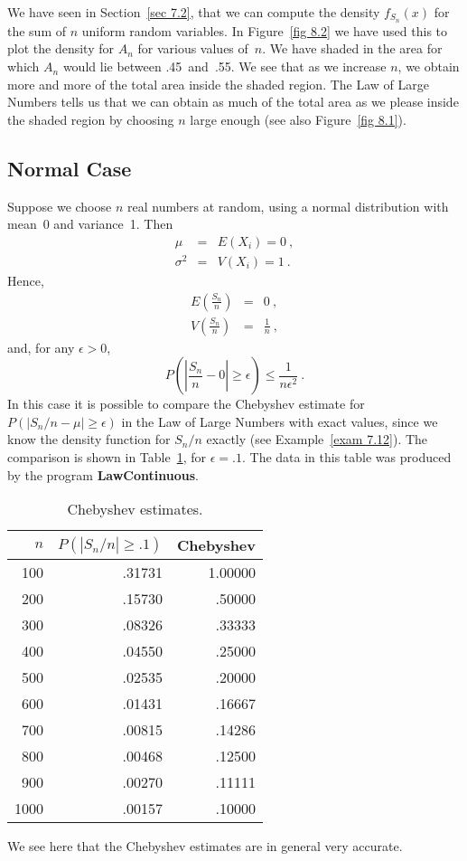{\begin{example}
We have seen in Section~\ref{sec 7.2}, that we can compute the density
$f_{S_n}(x)$ for the sum of $n$ uniform random variables.  In Figure~\ref{fig 8.2} we have
used this to plot the density for $A_n$ for various values of~$n$.  We have
shaded in the area for which $A_n$ would lie between .45~and~.55.  We see that as
we increase $n$, we obtain more and more of the total area inside the shaded
region.  The Law of Large Numbers tells us that we can obtain as much of the
total area as we please inside the shaded region by choosing $n$ large enough
(see also Figure~\ref{fig 8.1}).
\end{example}

\subsection*{Normal Case}
\begin{example}
Suppose we choose $n$ real numbers at random,
using a normal distribution with mean~0 and variance~1.  Then
\begin{eqnarray*}
         \mu &=& E(X_i) = 0\ , \\
    \sigma^2 &=& V(X_i) = 1\ .
\end{eqnarray*}
Hence,
\begin{eqnarray*}
E \left( \frac {S_n}n \right) &=& 0\ , \\
V \left( \frac {S_n}n \right) &=& \frac 1n\ ,
\end{eqnarray*}
and, for any $\epsilon > 0$,
$$
P\left( \left| \frac {S_n}n - 0 \right| \geq \epsilon \right) \leq \frac
1{n\epsilon^2}\ .
$$
In this case it is possible to compare the Chebyshev estimate for $P(|S_n/n -
\mu| \geq \epsilon)$ in the Law of Large Numbers with exact values, since we
know the density function for $S_n/n$ exactly (see Example~\ref{exam 7.12}). 
The comparison is shown in Table~\ref{table 8.1}, for $\epsilon = .1$.  The data
in this table was produced by the program {\bf LawContinuous}.
\begin{table}
\centering
\begin{tabular}{r|r|r}
$n$ & $P(|S_n/n| \ge .1)$ & Chebyshev \\
\hline
100 & .31731 & 1.00000 \\
200 & .15730 & .50000 \\
300 & .08326 & .33333 \\
400 & .04550 & .25000 \\
500 & .02535 & .20000 \\
600 & .01431 & .16667 \\
700 & .00815 & .14286 \\
800 & .00468 & .12500 \\
900 & .00270 & .11111 \\
1000 & .00157 & .10000 \\
\hline
\end{tabular}
\caption{Chebyshev estimates.}
\label{table 8.1}
\end{table}
We see here that the Chebyshev estimates are in general  very 
accurate.
\end{example}

}
